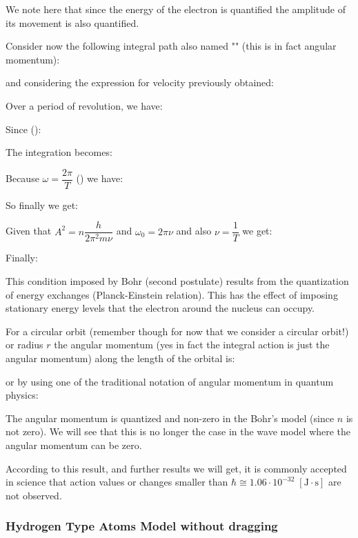 We note here that since the energy of the electron is quantified the amplitude of its movement is also quantified.

Consider now the following integral path also named "" (this is in fact angular momentum):
	
and considering the expression  for velocity previously obtained:
	
Over a period of revolution, we have:
	
Since ():
	
The integration becomes:
	
Because $\omega=\dfrac{2\pi}{T}$ () we have:
	
So finally we get:
	
Given that $A^2=n\dfrac{h}{2\pi^2m\nu}$ and $\omega_0=2\pi\nu$ and also $\nu=\dfrac{1}{T}$ we get:
	
Finally:
	
This condition imposed by Bohr (second postulate) results from the quantization of energy exchanges (Planck-Einstein relation). This has the effect of imposing stationary energy levels that the electron around the nucleus can occupy.

For a circular orbit (remember though for now that we consider a circular orbit!) or radius $r$ the angular momentum (yes in fact the integral action is just the angular momentum) along the length of the orbital is:
	
or by using one of the traditional notation of angular momentum in quantum physics\label{quantized angular momentum}:
	
The angular momentum is quantized and non-zero in the Bohr's model (since $n$ is not zero). We will see that this is no longer the case in the wave model where the angular momentum can be zero.

	According to this result, and further results we will get, it is commonly accepted in science that action values or changes smaller than $\hbar\cong 1.06\cdot 10^{-32}\;[\text{J}\cdot \text{s}]$ are not observed.

	\subsubsection{Hydrogen Type Atoms Model without dragging}
	
